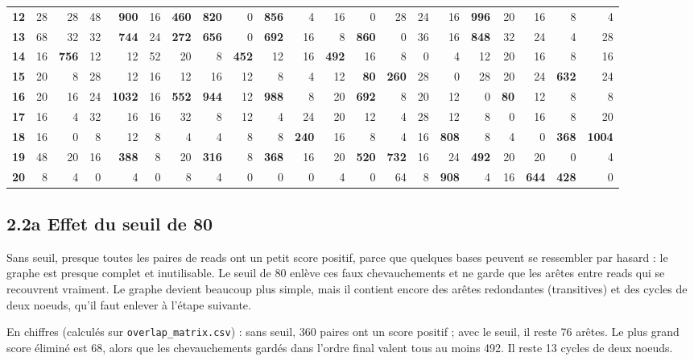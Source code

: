 \documentclass[11pt]{article}
\begin{document}
\begin{table}[h]
{\begin{tabular}{c|rrrrrrrrrrrrrrrrrrrr}
\textbf{12} & 28 & 28 & 48 & \textbf{900} & 16 & \textbf{460} & \textbf{820} & 0 & \textbf{856} & 4 & 16 & 0 & 28 & 24 & 16 & \textbf{996} & 20 & 16 & 8 & 4 \\
\textbf{13} & 68 & 32 & 32 & \textbf{744} & 24 & \textbf{272} & \textbf{656} & 0 & \textbf{692} & 16 & 8 & \textbf{860} & 0 & 36 & 16 & \textbf{848} & 32 & 24 & 4 & 28 \\
\textbf{14} & 16 & \textbf{756} & 12 & 12 & 52 & 20 & 8 & \textbf{452} & 12 & 16 & \textbf{492} & 16 & 8 & 0 & 4 & 12 & 20 & 16 & 8 & 16 \\
\textbf{15} & 20 & 8 & 28 & 12 & 16 & 12 & 16 & 12 & 8 & 4 & 12 & \textbf{80} & \textbf{260} & 28 & 0 & 28 & 20 & 24 & \textbf{632} & 24 \\
\textbf{16} & 20 & 16 & 24 & \textbf{1032} & 16 & \textbf{552} & \textbf{944} & 12 & \textbf{988} & 8 & 20 & \textbf{692} & 8 & 20 & 12 & 0 & \textbf{80} & 12 & 8 & 8 \\
\textbf{17} & 16 & 4 & 32 & 16 & 16 & 32 & 8 & 12 & 4 & 24 & 20 & 12 & 4 & 28 & 12 & 8 & 0 & 16 & 8 & 20 \\
\textbf{18} & 16 & 0 & 8 & 12 & 8 & 4 & 4 & 8 & 8 & \textbf{240} & 16 & 8 & 4 & 16 & \textbf{808} & 8 & 4 & 0 & \textbf{368} & \textbf{1004} \\
\textbf{19} & 48 & 20 & 16 & \textbf{388} & 8 & 20 & \textbf{316} & 8 & \textbf{368} & 16 & 20 & \textbf{520} & \textbf{732} & 16 & 24 & \textbf{492} & 20 & 20 & 0 & 4 \\
\textbf{20} & 8 & 4 & 0 & 4 & 0 & 8 & 4 & 0 & 0 & 0 & 4 & 0 & 64 & 8 & \textbf{908} & 4 & 16 & \textbf{644} & \textbf{428} & 0 \\
\end{tabular}}
\end{table}

\subsection*{2.2a Effet du seuil de 80}
Sans seuil, presque toutes les paires de reads ont un petit score positif, parce que quelques bases peuvent se
ressembler par hasard : le graphe est presque complet et inutilisable. Le seuil de 80 enlève ces faux
chevauchements et ne garde que les arêtes entre reads qui se recouvrent vraiment. Le graphe devient beaucoup plus
simple, mais il contient encore des arêtes redondantes (transitives) et des cycles de deux noeuds, qu'il faut
enlever à l'étape suivante.

En chiffres (calculés sur \texttt{overlap\_matrix.csv}) : sans seuil, 360 paires ont un score positif ; avec le
seuil, il reste 76 arêtes. Le plus grand score éliminé est 68, alors que les chevauchements gardés dans l'ordre
final valent tous au moins 492. Il reste 13 cycles de deux noeuds.
\end{document}
